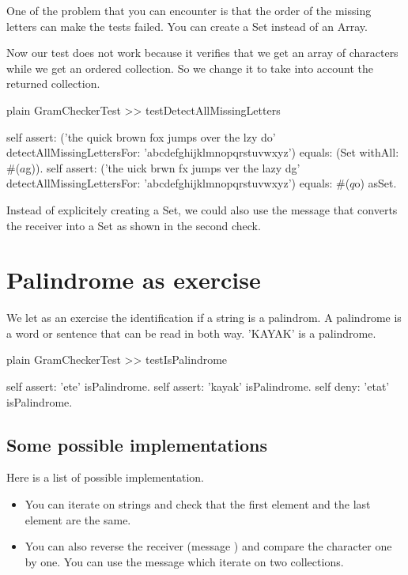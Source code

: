 \documentclass[10pt,twoside,english]{_support/latex/sbabook/sbabook}
\begin{document}
One of the problem that you can encounter is that the order of the missing letters can make the tests failed. You can create a Set instead of an Array. 

Now our test does not work because it  verifies that we get an array of characters while we get an ordered collection. So we change it to take into account the returned collection. 

\begin{displaycode}{plain}
GramCheckerTest >> testDetectAllMissingLetters

	self assert: ('the quick brown fox jumps over the lzy do' 
		detectAllMissingLettersFor: 'abcdefghijklmnopqrstuvwxyz') equals: (Set withAll: #($a $g)).
	self assert: ('the uick brwn fx jumps ver the lazy dg' 
		detectAllMissingLettersFor: 'abcdefghijklmnopqrstuvwxyz') equals: #($q $o) asSet.
\end{displaycode}

Instead of explicitely creating a Set, we could also use the message  that converts the receiver into a Set as shown in the second check. 
\section{Palindrome as exercise}
We let as an exercise the identification if a string is a palindrom. 
A palindrome is a word or sentence that can be read in both way. 'KAYAK' is a palindrome. 

\begin{displaycode}{plain}
GramCheckerTest >> testIsPalindrome

	self assert: 'ete' isPalindrome.
	self assert: 'kayak' isPalindrome.
	self deny: 'etat' isPalindrome.
\end{displaycode}
\subsection{Some possible implementations}
Here is a list of possible implementation.

\begin{itemize}
\item You can iterate on strings and check that the first element and the last element are the same. 
\item You can also reverse the receiver (message ) and compare the character one by one. You can use the message  which iterate on two collections. 
\end{itemize}
\end{document}
